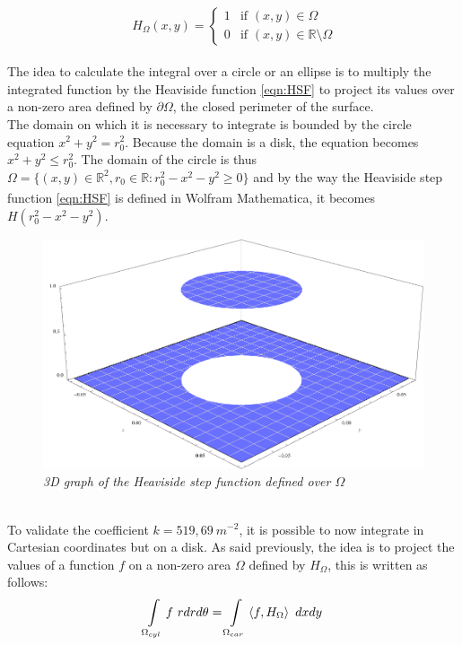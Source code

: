 \\
\begin{equation}
     \ H_{\Omega}(x,y) =
    \begin{cases}
        1 & \text{if } (x,y) \in \Omega\\
        0 & \text{if } (x,y) \in \mathbb{R}\setminus\Omega
    \end{cases}
    \label{eqn:HSF}
\end{equation}
\\
\normalsize{\indent The idea to calculate the integral over a circle or an ellipse is to multiply the integrated function by the Heaviside function \eqref{eqn:HSF} to project its values over a non-zero area defined by $\partial \Omega$, the closed perimeter of the surface.}
\\
\break
\normalsize{\indent The domain on which it is necessary to integrate is bounded by the circle equation $x^2 + y^2 = r_0^2$. Because the domain is a disk, the equation becomes $x^2 + y^2 \leq r_0^2$. The domain of the circle is thus $\Omega = \{ (x,y) \in \mathbb{R}^2, r_0 \in \mathbb{R} : r_0^2 - x^2 - y^2 \geq 0 \}$ and by the way the Heaviside step function \eqref{eqn:HSF} is defined in Wolfram Mathematica\textsuperscript{\textregistered}, it becomes $H(r_0^2 - x^2 - y^2)$.}
\\
\begin{figure}[h!] 
    \centering
    \includegraphics[width=.7\textwidth]{figures/stepfunction.png}
    \caption{\it 3D graph of the Heaviside step function defined over $\Omega$}
    \label{fig:fig_4_2}
\end{figure}
\\
\normalsize{\indent To validate the coefficient $k=519,69 \ m^{-2}$, it is possible to now integrate in Cartesian coordinates but on a disk. As said previously, the idea is to project the values of a function $f$ on a non-zero area $\Omega$ defined by $H_\Omega$, this is written as follows:}
\\
\begin{equation}
    \int\displaylimits_{\Omega_{cyl}} f \ rdrd\theta = \int\displaylimits_{\Omega_{car}} \proj{f}{H_\Omega} \ dxdy
\end{equation}
